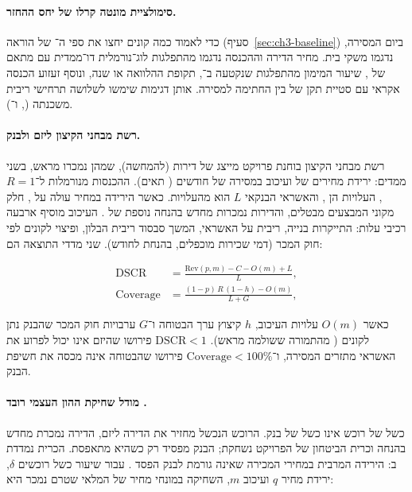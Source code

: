\paragraph{סימולציית מונטה קרלו של יחס ההחזר.}\label{subsec:ch5-mc} כדי לאמוד כמה קונים יחצו את ספי ה־ של הוראה  (סעיף~\ref{sec:ch3-baseline}) ביום המסירה, נדגמו  משקי בית. מחיר הדירה וההכנסה נדגמו מהתפלגות לוג־נורמלית דו־ממדית עם מתאם של , שיעור המימון מהתפלגות  שנקטעה ב־, תקופת ההלוואה  או  שנה, ונוסף זעזוע הכנסה אקראי עם סטיית תקן של  בין החתימה למסירה. אותן דגימות שימשו לשלושה תרחישי ריבית משכנתה (,  ו־).

\paragraph{רשת מבחני הקיצון ליזם ולבנק.}\label{subsec:ch5-stress} רשת מבחני הקיצון בוחנת פרויקט מייצג של  דירות (להמחשה), שמהן  נמכרו מראש, בשני ממדים: ירידת מחירים של  ועיכוב במסירה של  חודשים ( תאים). ההכנסות מנורמלות ל־$R=1$, העלויות הן , והאשראי הבנקאי $L$ הוא  מהעלויות. כאשר הירידה במחיר עולה על , חלק מקוני המבצעים מבטלים, והדירות נמכרות מחדש בהנחה נוספת של . העיכוב מוסיף ארבעה רכיבי עלות: התייקרות בנייה, ריבית על האשראי, המשך סבסוד ריבית הבלון, ופיצוי לקונים לפי חוק המכר \cite{salelaw1974} (דמי שכירות מוכפלים, בהנחת  לחודש). שני מדדי התוצאה הם:

\begin{align}
\mathrm{DSCR} &= \frac{\mathrm{Rev}(p,m) - C - O(m) + L}{L}, \label{eq:ch5-dscr}\\
\mathrm{Coverage} &= \frac{(1-p)\,R\,(1-h) - O(m)}{L + G}, \label{eq:ch5-coverage}
\end{align}

כאשר $O(m)$ עלויות העיכוב, $h$ קיצוץ ערך הבטוחה ו־$G$ ערבויות חוק המכר שהבנק נתן לקונים ( מהתמורה ששולמה מראש). $\mathrm{DSCR}<1$ פירושו שהיזם אינו יכול לפרוע את האשראי מתזרים המסירה, ו־$\mathrm{Coverage}<100\%$ פירושו שהבטוחה אינה מכסה את חשיפת הבנק.

\paragraph{מודל שחיקת ההון העצמי רובד .}\label{subsec:ch5-cet1} כשל של רוכש אינו כשל של בנק. הרוכש הנכשל מחזיר את הדירה ליזם, הדירה נמכרת מחדש בהנחה וכרית הביטחון של הפרויקט נשחקת; הבנק מפסיד רק כשהיא מתאפסת. הכרית נמדדת ב: הירידה המרבית במחירי המכירה שאינה גורמת לבנק הפסד \cite{boi_survey2025}. עבור שיעור כשל רוכשים $\delta$, ירידת מחיר $q$ ועיכוב $m$, השחיקה במונחי מחיר של המלאי שטרם נמכר היא:


